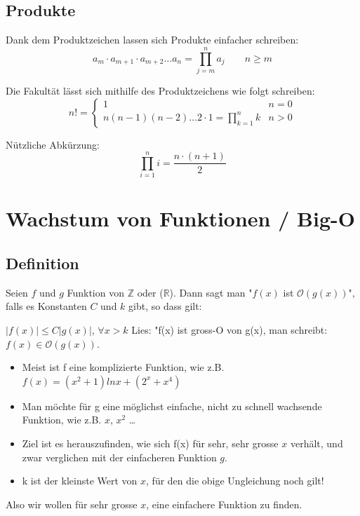 \documentclass[12pt]{scrartcl}
\begin{document}
\subsection{Produkte}
Dank dem Produktzeichen lassen sich Produkte einfacher schreiben:\\


\[a_m \cdot a_{m+1} \cdot a_{m+2} \dots a_n = \prod_{j=m}^{n} a_j \quad\quad n \geqslant m\]

Die Fakultät lässt sich mithilfe des Produktzeichens wie folgt schreiben:\\
\[n! = 
\begin{cases}
    1 & n=0 \\
    n(n - 1)(n - 2) \dots 2 \cdot 1 = \prod_{k=1}^{n}k & n > 0
\end{cases}\]


Nützliche Abkürzung:
\[\prod_{i=1}^{n} i = \frac{n \cdot (n + 1)}{2}\]

\newpage
\section{Wachstum von Funktionen / Big-O}

\subsection{Definition}
Seien $f$ und $g$ Funktion von $\mathbb{Z}$ oder ($\mathbb{R}$). Dann sagt man "$f(x)$ ist $\mathcal{O}(g(x))$", falls es
Konstanten $C$ und $k$ gibt, so dass gilt:

$|f(x)| \leq C|g(x)|$, $\forall x > k$ Lies: "f(x) ist gross-O von g(x), man schreibt: $f(x) \in \mathcal{O}(g(x))$.

\begin{itemize}
    \item Meist ist f eine komplizierte Funktion, wie z.B. $f(x) = (x^2 + 1) ln x + (2^x + x^4)$
    \item Man möchte für g eine möglichst einfache, nicht zu schnell wachsende Funktion, wie z.B. $x$, $x^2$ \dots
    \item Ziel ist es herauszufinden, wie sich f(x) für sehr, sehr grosse $x$ verhält, und zwar verglichen mit der einfacheren Funktion $g$.
    \item k ist der kleinste Wert von $x$, für den die obige Ungleichung noch gilt!
\end{itemize}

Also wir wollen für sehr grosse $x$, eine einfachere Funktion zu finden.
\end{document}
